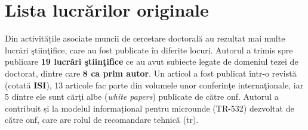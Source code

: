 \section{Lista lucrărilor originale \label{sec:papers}}

Din activitățile asociate muncii de cercetare doctorală au rezultat mai multe lucrări ştiinţifice, care au fost publicate în diferite locuri. Autorul a trimis spre publicare \textbf{19 lucrări ştiinţifice} ce au avut subiecte legate de domeniul tezei de doctorat, dintre care \textbf{8 ca prim autor}. Un articol a fost publicat într-o revistă (cotată \textbf{ISI}), 13 articole fac parte din volumele unor conferinţe internaţionale, iar 5 dintre ele sunt cărţi albe (\textit{white papers}) publicate de către \gls{onf}. Autorul a contribuit și la modelul informațional pentru microunde (TR-532) dezvoltat de către \gls{onf}, care are rolul de recomandare tehnică (\gls{tr}).

